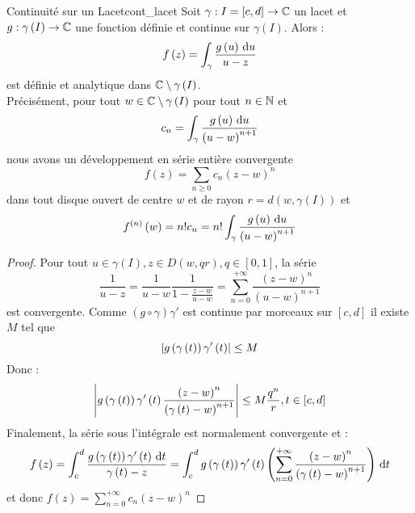 \documentclass{cours}
\begin{document}
\begin{propositionfr}{Continuité sur un Lacet}{cont_lacet}
    Soit $\gamma : I = \left[c, d\right] \to \mathbb{C}$ un lacet et $g : \gamma\left(I\right) \to \mathbb{C}$ une fonction définie et continue sur $\gamma\left(I\right)$. Alors : 
    \begin{equation*}
        f\left(z\right) = \int_{\gamma}\frac{g\left(u\right){\rm \, d} u}{u - z}
    \end{equation*}
    est définie et analytique dans $\mathbb{C} \setminus \gamma\left(I\right)$.\\
    Précisément, pour tout $w \in \mathbb{C} \setminus \gamma\left(I\right)$ pour tout $n \in \mathbb{N}$ et 
    \begin{equation*}
        c_{n} = \int_{\gamma} \frac{g\left(u\right){\rm \, d} u}{\left(u - w\right)^{n + 1}}
    \end{equation*}
    nous avons un développement en série entière convergente 
    \begin{equation*}
        f\left(z\right) = \sum_{n \geq 0}c_{n}\left(z - w\right)^{n}
    \end{equation*}
    dans tout disque ouvert de centre $w$ et de rayon $r = d\left(w, \gamma\left(I\right)\right)$ et 
    \begin{equation*}
        f^{\left(n\right)}\left(w\right) = n!c_{n} = n!\int_{\gamma}\frac{g\left(u\right){\rm \, d} u}{\left(u - w\right)^{n + 1}}
    \end{equation*}
\end{propositionfr}
\begin{proof}
    Pour tout $u \in \gamma\left(I\right), z \in D\left(w, qr\right), q \in \left[0, 1\right]$, la série 
    \begin{equation*}
        \frac{1}{u - z} = \frac{1}{u - w} \frac{1}{1 - \frac{z-w}{u-w}} = \sum_{n = 0}^{+\infty}\frac{\left(z - w\right)^{n}}{\left(u - w\right)^{n + 1}}
    \end{equation*}
    est convergente. Comme $\left(g \circ \gamma\right)\gamma'$ est continue par morceaux sur $\left[c, d\right]$ il existe $M$ tel que 
    \begin{equation*}
        \left|g\left(\gamma\left(t\right)\right)\gamma'\left(t\right)\right| \leq M
    \end{equation*}
    Donc :
    \begin{equation*}
        \left|g\left(\gamma\left(t\right)\right)\gamma'\left(t\right)\frac{\left(z - w\right)^{n}}{\left(\gamma\left(t\right) - w\right)^{n + 1}}\right| \leq M \frac{q^{n}}{r}, t\in \left[c, d\right]
    \end{equation*}
    Finalement, la série sous l'intégrale est normalement convergente et : 
    \begin{equation*}
        f\left(z\right) = \int_{c}^{d}\frac{g\left(\gamma\left(t\right)\right)\gamma'\left(t\right){\rm \, d} t}{\gamma\left(t\right) - z} = \int_{c}^{d}g\left(\gamma\left(t\right)\right)\gamma'\left(t\right)\left(\sum_{n = 0}^{+\infty}\frac{\left(z - w\right)^{n}}{\left(\gamma\left(t\right) - w\right)^{n + 1}} \right){\rm \, d} t
    \end{equation*}
    et donc $f\left(z\right) = \sum_{n = 0}^{+ \infty} c_{n}\left(z - w\right)^{n}$
\end{proof}
\end{document}

